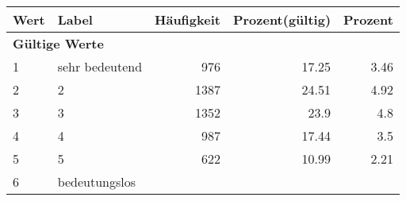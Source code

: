      \begin{longtable}{lXrrr}
     \toprule
     \textbf{Wert} & \textbf{Label} & \textbf{Häufigkeit} & \textbf{Prozent(gültig)} & \textbf{Prozent} \\
     \endhead
     \midrule
     \multicolumn{5}{l}{\textbf{Gültige Werte}}\\

     1 &
     \multicolumn{1}{X}{ sehr bedeutend   } &


       \num{976} &
       \num[round-mode=places,round-precision=2]{17,25} &
         \num[round-mode=places,round-precision=2]{3,46} \\

     2 &
     \multicolumn{1}{X}{ 2   } &


       \num{1387} &
       \num[round-mode=places,round-precision=2]{24,51} &
         \num[round-mode=places,round-precision=2]{4,92} \\

     3 &
     \multicolumn{1}{X}{ 3   } &


       \num{1352} &
       \num[round-mode=places,round-precision=2]{23,9} &
         \num[round-mode=places,round-precision=2]{4,8} \\

     4 &
     \multicolumn{1}{X}{ 4   } &


       \num{987} &
       \num[round-mode=places,round-precision=2]{17,44} &
         \num[round-mode=places,round-precision=2]{3,5} \\

     5 &
     \multicolumn{1}{X}{ 5   } &


       \num{622} &
       \num[round-mode=places,round-precision=2]{10,99} &
         \num[round-mode=places,round-precision=2]{2,21} \\

     6 &
     \multicolumn{1}{X}{ bedeutungslos   } &



\end{longtable}
